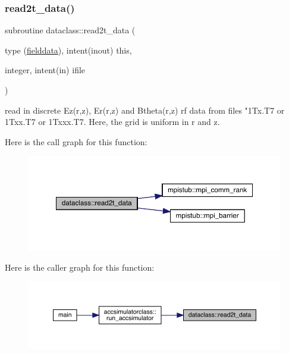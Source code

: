 \subsubsection{\texorpdfstring{read2t\_data()}{read2t\_data()}}
{\footnotesize\ttfamily subroutine dataclass\+::read2t\+\_\+data (\begin{DoxyParamCaption}\item[{type (\mbox{\hyperlink{namespacedataclass_structdataclass_1_1fielddata}{fielddata}}), intent(inout)}]{this,  }\item[{integer, intent(in)}]{ifile }\end{DoxyParamCaption})}



read in discrete Ez(r,z), Er(r,z) and Btheta(r,z) rf data from files "1\+Tx.\+T7 or 1\+Txx.\+T7 or 1\+Txxx.\+T7. Here, the grid is uniform in r and z. 

Here is the call graph for this function\+:\nopagebreak
\begin{figure}[H]
\begin{center}
\leavevmode
\includegraphics[width=350pt]{namespacedataclass_a6a03d5b21b9316f6fd4053aeb7acb426_cgraph}
\end{center}
\end{figure}
Here is the caller graph for this function\+:\nopagebreak
\begin{figure}[H]
\begin{center}
\leavevmode
\includegraphics[width=350pt]{namespacedataclass_a6a03d5b21b9316f6fd4053aeb7acb426_icgraph}
\end{center}
\end{figure}
\mbox{\label{namespacedataclass_af6df6f58c6c53c92a78e3d512d6a4d03}} 
